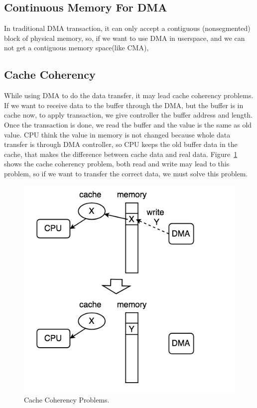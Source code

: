 \subsection{Continuous Memory For DMA}
\label{subsec:Continuous Memory For DMA}
In traditional DMA transaction, it can only accept a contiguous (nonsegmented) block of
physical memory, so, if we want to use DMA in userspace, and we can not get a contiguous 
memory space(like CMA), 




\subsection{Cache Coherency}
\label{subsec:Cache Coherency}
While using DMA to do the data transfer, it may lead cache coherency problems. If we want to receive data to the buffer through the DMA, but the buffer is in cache now, to apply transaction, we give controller the buffer address and length. Once the transaction is done, we read the buffer and the value is the same as old value. CPU think the value in memory is not changed because whole data transfer is through DMA controller, so CPU keeps the old buffer data in the cache, that makes the difference between cache data and real data. Figure~\ref{fig:Cache Coherency Problems.} shows the cache coherency problem, both read and write may lead to this problem, so if we want to transfer the correct data, we must solve this problem.
\begin{figure}[!htb]
  \centering
  \includegraphics[scale=0.5]{images/cache_coherency.jpg}
  \caption[Cache Coherency Problems.]{Cache Coherency Problems.}
  \label{fig:Cache Coherency Problems.}
\end{figure}
\newpage
